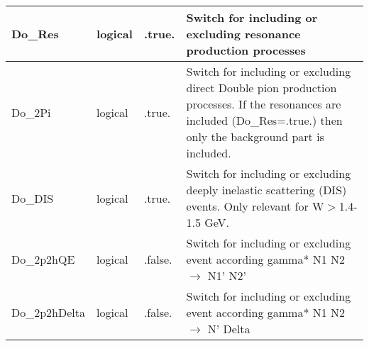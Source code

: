 \documentclass{article}
\begin{document}
\begin{longtable}{llll}
\midrule
Do\_Res & \begin{minipage}[t]{2cm}logical\end{minipage} & \begin{minipage}[t]{2cm}.true.\end{minipage} & \begin{minipage}[t]{12cm}Switch for including or excluding resonance production processes\end{minipage}\\*
\midrule
Do\_2Pi & \begin{minipage}[t]{2cm}logical\end{minipage} & \begin{minipage}[t]{2cm}.true.\end{minipage} & \begin{minipage}[t]{12cm}Switch for including or excluding direct Double pion production processes. If the resonances are included (Do\_Res=.true.) then only the background part is included.\end{minipage}\\*
\midrule
Do\_DIS & \begin{minipage}[t]{2cm}logical\end{minipage} & \begin{minipage}[t]{2cm}.true.\end{minipage} & \begin{minipage}[t]{12cm}Switch for including or excluding deeply inelastic scattering (DIS) events. Only relevant for W$>$1.4-1.5 GeV.\end{minipage}\\*
\midrule
Do\_2p2hQE & \begin{minipage}[t]{2cm}logical\end{minipage} & \begin{minipage}[t]{2cm}.false.\end{minipage} & \begin{minipage}[t]{12cm}Switch for including or excluding event according gamma* N1 N2 $\rightarrow$ N1' N2'\end{minipage}\\*
\midrule
Do\_2p2hDelta & \begin{minipage}[t]{2cm}logical\end{minipage} & \begin{minipage}[t]{2cm}.false.\end{minipage} & \begin{minipage}[t]{12cm}Switch for including or excluding event according gamma* N1 N2 $\rightarrow$ N' Delta\end{minipage}\\*

\end{longtable}
\end{document}
